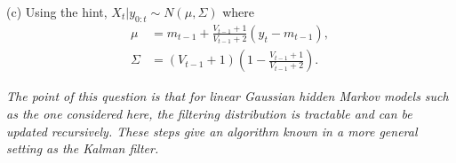 \documentclass[12pt,BCOR2mm,DIV14,english]{scrreprt}
\theoremstyle{exmp}
\begin{document}
\begin{enumerate}
(c) Using the hint, $X_t|y_{0:t}\sim N(\mu,\Sigma)$ where
\begin{align*}
\mu&=m_{t-1}+\frac{V_{t-1}+1}{V_{t-1}+2}(y_t-m_{t-1}),\\
\Sigma&=(V_{t-1}+1)\left(1-\frac{V_{t-1}+1}{V_{t-1}+2}\right).
\end{align*}

\emph{The point of this question is that for linear Gaussian hidden Markov models such as the 
one considered here, the filtering distribution is tractable and can be updated recursively. 
These steps give an algorithm known in a more general setting as the Kalman filter.}


\end{enumerate}
\end{document}
